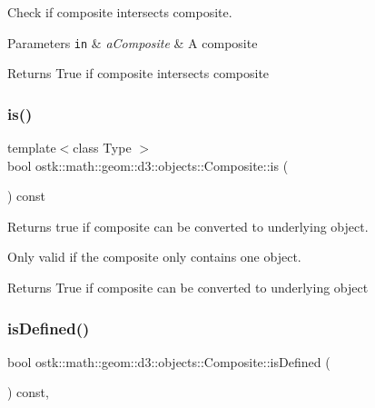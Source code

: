 Check if composite intersects composite. 


\begin{DoxyParams}[1]{Parameters}
\mbox{\tt in}  & {\em a\+Composite} & A composite \\
\hline
\end{DoxyParams}
\begin{DoxyReturn}{Returns}
True if composite intersects composite 
\end{DoxyReturn}
\mbox{\label{classostk_1_1math_1_1geom_1_1d3_1_1objects_1_1_composite_acbe01e7ef63382a16aa0b33f10d7a620}} 
\subsubsection{\texorpdfstring{is()}{is()}}
{\footnotesize\ttfamily template$<$class Type $>$ \\
bool ostk\+::math\+::geom\+::d3\+::objects\+::\+Composite\+::is (\begin{DoxyParamCaption}{ }\end{DoxyParamCaption}) const\hspace{0.3cm}{\ttfamily [inline]}}



Returns true if composite can be converted to underlying object. 

Only valid if the composite only contains one object.

\begin{DoxyReturn}{Returns}
True if composite can be converted to underlying object 
\end{DoxyReturn}
\mbox{\label{classostk_1_1math_1_1geom_1_1d3_1_1objects_1_1_composite_afda60d7f0111f98729e9c9d96ba4e1d5}} 
\subsubsection{\texorpdfstring{is\+Defined()}{isDefined()}}
{\footnotesize\ttfamily bool ostk\+::math\+::geom\+::d3\+::objects\+::\+Composite\+::is\+Defined (\begin{DoxyParamCaption}{ }\end{DoxyParamCaption}) const\hspace{0.3cm}{\ttfamily [override]}, {\ttfamily [virtual]}}



